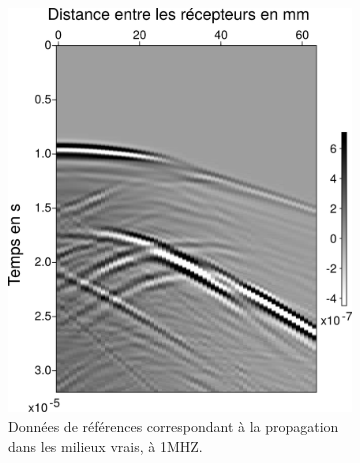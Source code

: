 \documentclass[a4paper,11pt]{report} %
\begin{document}
\begin{figure}[!h]
	\centering
	\begin{subfigure}{0.45\textwidth}
		\includegraphics[width=\textwidth]{img/multi_trans/comp/data_true.png}
		\caption{Données de références correspondant à la propagation dans les milieux vrais, à 1MHZ.}
	\end{subfigure}
	\begin{subfigure}{0.45\textwidth}

\end{subfigure}
\end{figure}
\end{document}
